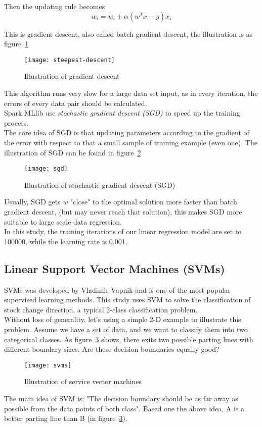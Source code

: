 Then the updating rule becomes
\begin{equation}
w_i = w_i + \alpha (w^Tx-y)x_i
\end{equation}

This is gradient descent, also called batch gradient descent, the illustration is as figure~\ref{fg:gradient_descent}
\begin{figure}[h]
	\centering
	\texttt{[image: steepest-descent]}
	\caption{Illustration of gradient descent}
	\label{fg:gradient_descent}
\end{figure}

This algorithm runs very slow for a large data set input, as in every iteration, the errors of every data pair should be calculated.\\


Spark MLlib use \emph{stochastic gradient descent (SGD)} to speed up the training process\cite{7_mllib_linear_methods}.\\


The core idea of SGD is that updating parameters according to the gradient of the error with respect to that a small sample of training example (even one). The illustration of SGD can be found in figure~\ref{fg:SGD}
\begin{figure}[h]
	\centering
	\texttt{[image: sgd]}
	\caption{Illustration of stochastic gradient descent (SGD)}
	\label{fg:SGD}
\end{figure}
Usually, SGD gets $ w $ "close" to the optimal solution more faster than batch gradient descent\cite{bottou2010large}, (but may never reach that solution), this makes SGD more suitable to large scale data regression.\\


In this study, the training iterations of our linear regression model are set to 100000, while the learning rate is 0.001.

\subsection{Linear Support Vector Machines (SVMs)}
SVMs was developed by Vladimir Vapnik\cite{cortes1995support} and is one of the most popular supervised learning methods. This study uses SVM to solve the classification of stock change direction, a typical 2-class classification problem.\\


Without loss of generality, let's using a simple 2-D example to illustrate this problem. Assume we have a set of data, and we want to classify them into two categorical classes. As figure~\ref{fg:SVM} shows, there exits two possible parting lines with different boundary sizes. Are these decision boundaries equally good?
\begin{figure}[h]
	\centering
	\texttt{[image: svms]}
	\caption{Illustration of service vector machines\cite{8_svm_2016}}
	\label{fg:SVM}
\end{figure}
The main idea of SVM is: "The decision boundary should be as far away as possible from the data points of both class"\cite{4_kantardzic}. Based one the above idea, A is a better parting line than B (in figure~\ref{fg:SVM}).\\


